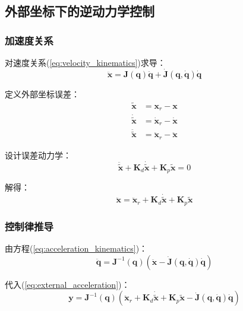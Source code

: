 \documentclass[12pt,a4paper]{article}
\begin{document}
\subsection{外部坐标下的逆动力学控制}

\subsubsection{加速度关系}

对速度关系(\ref{eq:velocity_kinematics})求导：
\begin{equation}
\ddot{\mathbf{x}} = \mathbf{J}(\mathbf{q})\ddot{\mathbf{q}} + \dot{\mathbf{J}}(\mathbf{q},\dot{\mathbf{q}})\dot{\mathbf{q}}
\label{eq:acceleration_kinematics}
\end{equation}

定义外部坐标误差：
\begin{align}
\tilde{\mathbf{x}} &= \mathbf{x}_r - \mathbf{x} \\
\dot{\tilde{\mathbf{x}}} &= \dot{\mathbf{x}}_r - \dot{\mathbf{x}} \\
\ddot{\tilde{\mathbf{x}}} &= \ddot{\mathbf{x}}_r - \ddot{\mathbf{x}}
\end{align}

设计误差动力学：
\begin{equation}
\ddot{\tilde{\mathbf{x}}} + \mathbf{K}_d\dot{\tilde{\mathbf{x}}} + \mathbf{K}_p\tilde{\mathbf{x}} = 0
\label{eq:external_error_dynamics}
\end{equation}

解得：
\begin{equation}
\ddot{\mathbf{x}} = \ddot{\mathbf{x}}_r + \mathbf{K}_d\dot{\tilde{\mathbf{x}}} + \mathbf{K}_p\tilde{\mathbf{x}}
\label{eq:external_acceleration}
\end{equation}

\subsubsection{控制律推导}

由方程(\ref{eq:acceleration_kinematics})：
\begin{equation}
\ddot{\mathbf{q}} = \mathbf{J}^{-1}(\mathbf{q})(\ddot{\mathbf{x}} - \dot{\mathbf{J}}(\mathbf{q},\dot{\mathbf{q}})\dot{\mathbf{q}})
\label{eq:joint_acceleration}
\end{equation}

代入(\ref{eq:external_acceleration})：
\begin{equation}
\mathbf{y} = \mathbf{J}^{-1}(\mathbf{q})(\ddot{\mathbf{x}}_r + \mathbf{K}_d\dot{\tilde{\mathbf{x}}} + \mathbf{K}_p\tilde{\mathbf{x}} - \dot{\mathbf{J}}(\mathbf{q},\dot{\mathbf{q}})\dot{\mathbf{q}})
\label{eq:external_y}
\end{equation}
\end{document}
